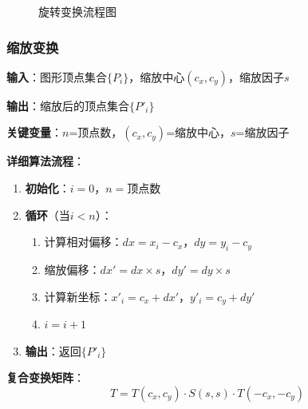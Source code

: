 \documentclass[12pt,a4paper]{article}
\begin{document}
\begin{tcolorbox}
\begin{figure}[H]
\caption{旋转变换流程图}
\label{fig:rotate_flow}
\end{figure}

\subsubsection{缩放变换}

\textbf{输入}：图形顶点集合$\{P_i\}$，缩放中心$(c_x, c_y)$，缩放因子$s$

\textbf{输出}：缩放后的顶点集合$\{P'_i\}$

\textbf{关键变量}：$n$=顶点数，$(c_x, c_y)$=缩放中心，$s$=缩放因子

\textbf{详细算法流程}：
\begin{enumerate}
    \item \textbf{初始化}：$i = 0$，$n = $顶点数
    \item \textbf{循环}（当$i < n$）：
    \begin{enumerate}
        \item 计算相对偏移：$dx = x_i - c_x$，$dy = y_i - c_y$
        \item 缩放偏移：$dx' = dx \times s$，$dy' = dy \times s$
        \item 计算新坐标：$x'_i = c_x + dx'$，$y'_i = c_y + dy'$
        \item $i = i + 1$
    \end{enumerate}
    \item \textbf{输出}：返回$\{P'_i\}$
\end{enumerate}

\textbf{复合变换矩阵}：
$$T = T(c_x, c_y) \cdot S(s, s) \cdot T(-c_x, -c_y)$$


\end{tcolorbox}
\end{document}
